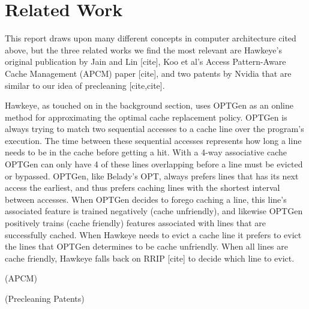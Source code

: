 \chapter{Related Work}

This report draws upon many different concepts in computer architecture cited above, but the three related works we find the most relevant are Hawkeye’s original publication by Jain and Lin [cite], Koo et al’s Access Pattern-Aware Cache Management (APCM) paper [cite], and two patents by Nvidia that are similar to our idea of precleaning [cite,cite].

Hawkeye, as touched on in the background section, uses OPTGen as an online method for approximating the optimal cache replacement policy. OPTGen is always trying to match two sequential accesses to a cache line over the program's execution. The time between these sequential accesses represents how long a line needs to be in the cache before getting a hit. With a 4-way associative cache OPTGen can only have 4 of these lines overlapping before a line must be evicted or bypassed. OPTGen, like Belady’s OPT, always prefers lines that has its next access the earliest, and thus prefers caching lines with the shortest interval between accesses. When OPTGen decides to forego caching a line, this line’s associated feature is trained negatively (cache unfriendly), and likewise OPTGen positively trains (cache friendly) features associated with lines that are successfully cached. When Hawkeye needs to evict a cache line it prefers to evict the lines that OPTGen determines to be cache unfriendly. When all lines are cache friendly, Hawkeye falls back on RRIP [cite] to decide which line to evict.

(APCM)

(Precleaning Patents)
